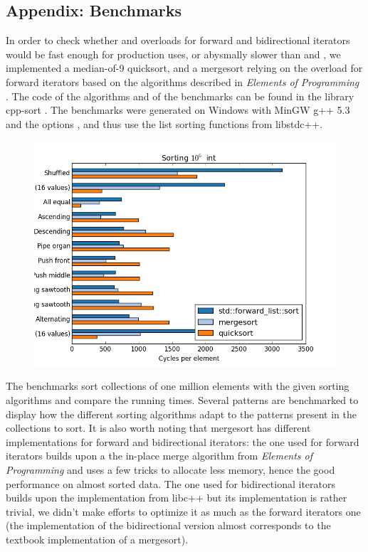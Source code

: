 \documentclass{isocpp_proposal}
\begin{document}
\newpage
\begin{appendices}
\section*{Appendix: Benchmarks} \label{App:Benchmarks}

In order to check whether  and  overloads for forward and bidirectional iterators would be fast enough for production uses, or abysmally slower than  and , we implemented a median-of-9 quicksort, and a mergesort relying on the  overload for forward iterators based on the algorithms described in \emph{Elements of Programming} \cite{EOP}. The code of the algorithms and of the benchmarks can be found in the library cpp-sort \cite{cpp-sort}. The benchmarks were generated on Windows with MinGW g++ 5.3 and the options , and thus use the list sorting functions from libstdc++.

\begin{figure}[h]
\includegraphics[width=\textwidth]{forward-list-int.png}
\end{figure}

\newpage

The benchmarks sort collections of one million elements with the given sorting algorithms and compare the running times. Several patterns are benchmarked to display how the different sorting algorithms adapt to the patterns present in the collections to sort. It is also worth noting that mergesort has different implementations for forward and bidirectional iterators: the one used for forward iterators builds upon a the in-place merge algorithm from \emph{Elements of Programming} and uses a few tricks to allocate less memory, hence the good performance on almost sorted data. The one used for bidirectional iterators builds upon the  implementation from libc++ but its implementation is rather trivial, we didn't make efforts to optimize it as much as the forward iterators one (the implementation of the bidirectional version almost corresponds to the textbook implementation of a mergesort).


\end{appendices}
\end{document}

